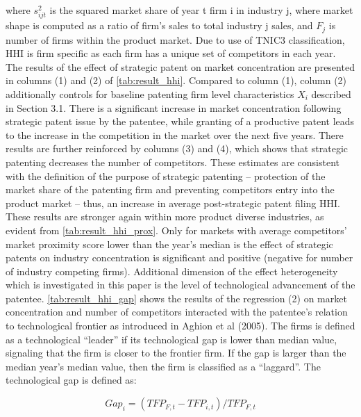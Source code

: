 \documentclass[11pt]{article}
\begin{document}
\noindent where $ s^2_{ijt}$ is the squared market share of year t firm i in industry j, where market shape is computed as a ratio of firm’s sales to total industry j sales, and $F_j$ is number of firms within the product market. Due to use of TNIC3 classification, HHI is firm specific as each firm has a unique set of competitors in each year. 
The results of the effect of strategic patent on market concentration are presented in columns (1) and (2) of \autoref{tab:result_hhi}. Compared to column (1), column (2) additionally controls for baseline patenting firm level characteristics $X_i$ described in Section 3.1. There is a significant increase in market concentration following strategic patent issue by the patentee, while granting of a productive patent leads to the increase in the competition in the market over the next five years. There results are further reinforced by columns (3) and (4), which shows that strategic patenting decreases the number of competitors. These estimates are consistent with the definition of the purpose of strategic patenting – protection of the market share of the patenting firm and preventing competitors entry into the product market – thus, an increase in average post-strategic patent filing HHI. These results are stronger again within more product diverse industries, as evident from \autoref{tab:result_hhi_prox}. Only for markets with average competitors’ market proximity score lower than the year’s median is the effect of strategic patents on industry concentration is significant and positive (negative for number of industry competing firms). Additional dimension of the effect heterogeneity which is investigated in this paper is the level of technological advancement of the patentee. \autoref{tab:result_hhi_gap} shows the results of the regression (2) on market concentration and number of competitors interacted with the patentee’s relation to technological frontier as introduced in \color{blue}Aghion et al (2005)\color{black}. The firms is defined as a technological “leader” if its technological gap is lower than median value, signaling that the firm is closer to the frontier firm. If the gap is larger than the median year’s median value, then the firm is classified as a “laggard”. The technological gap is defined as:

\begin{equation}
\label{eq:gap}
	Gap_i=(TFP_{F,t}-TFP_{i,t})/ TFP_{F,t}
\end{equation}
\end{document}
